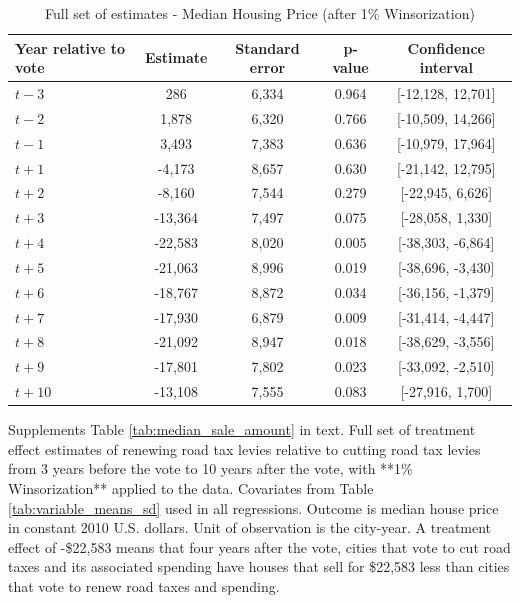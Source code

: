 \begin{table}[htbp]
    \centering
    \caption{Full set of estimates - Median Housing Price (after 1\% Winsorization)}
    \label{tab:median_sale_amount_winsorized}
    \begin{tabular}{p{3cm}cccc}
        \hline
        \textbf{Year relative to vote} & \textbf{Estimate} & \textbf{Standard error} & \textbf{p-value} & \textbf{Confidence interval} \\
        \hline
        $t - 3$  & 286     & 6,334  & 0.964  & [-12,128, 12,701] \\
        $t - 2$  & 1,878   & 6,320  & 0.766  & [-10,509, 14,266] \\
        $t - 1$  & 3,493   & 7,383  & 0.636  & [-10,979, 17,964] \\
        $t + 1$  & -4,173  & 8,657  & 0.630  & [-21,142, 12,795] \\
        $t + 2$  & -8,160  & 7,544  & 0.279  & [-22,945, 6,626] \\
        $t + 3$  & -13,364 & 7,497  & 0.075  & [-28,058, 1,330] \\
        $t + 4$  & -22,583 & 8,020  & 0.005  & [-38,303, -6,864] \\
        $t + 5$  & -21,063 & 8,996  & 0.019  & [-38,696, -3,430] \\
        $t + 6$  & -18,767 & 8,872  & 0.034  & [-36,156, -1,379] \\
        $t + 7$  & -17,930 & 6,879  & 0.009  & [-31,414, -4,447] \\
        $t + 8$  & -21,092 & 8,947  & 0.018  & [-38,629, -3,556] \\
        $t + 9$  & -17,801 & 7,802  & 0.023  & [-33,092, -2,510] \\
        $t + 10$ & -13,108 & 7,555  & 0.083  & [-27,916, 1,700] \\
        \hline
    \end{tabular}
    \begin{tablenotes}
        \small
        \item Supplements Table \ref{tab:median_sale_amount} in text. Full set of treatment effect estimates of renewing road tax levies relative to cutting road tax levies from 3 years before the vote to 10 years after the vote, with **1\% Winsorization** applied to the data. Covariates from Table \ref{tab:variable_means_sd} used in all regressions. Outcome is median house price in constant 2010 U.S. dollars. Unit of observation is the city-year. A treatment effect of -\$22,583 means that four years after the vote, cities that vote to cut road taxes and its associated spending have houses that sell for \$22,583 less than cities that vote to renew road taxes and spending.
    \end{tablenotes}
\end{table}

